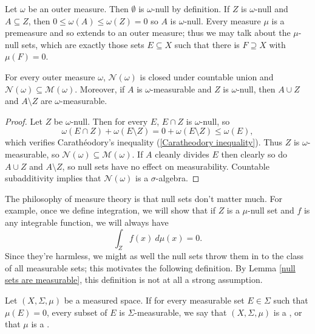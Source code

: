\begin{subsec}
Let $\omega$ be an outer measure. Then $\emptyset$ is $\omega$-null by definition.
If $Z$ is $\omega$-null and $A \subseteq Z$, then $0 \leq \omega(A) \leq \omega(Z) = 0$ so $A$ is $\omega$-null.
Every measure $\mu$ is a premeasure and so extends to an outer measure; thus we may talk about the $\mu$-null sets, which are exactly those sets $E \subseteq X$ such that there is $F \supseteq X$ with $\mu(F) = 0$.
\end{subsec}

\begin{lemma}
\label{null sets are measurable}
For every outer measure $\omega$, $\mathcal N(\omega)$ is closed under countable union and $\mathcal N(\omega) \subseteq \mathcal M(\omega)$.
Moreover, if $A$ is $\omega$-measurable and $Z$ is $\omega$-null, then $A \cup Z$ and $A \setminus Z$ are $\omega$-measurable.
\end{lemma}
\begin{proof}
Let $Z$ be $\omega$-null. Then for every $E$, $E \cap Z$ is $\omega$-null, so
\[\omega(E \cap Z) + \omega(E \setminus Z) = 0 + \omega(E \setminus Z) \leq \omega(E),\]
which verifies Carathéodory's inequality (\ref{Caratheodory inequality}).
Thus $Z$ is $\omega$-measurable, so $\mathcal N(\omega) \subseteq \mathcal M(\omega)$.
If $A$ cleanly divides $E$ then clearly so do $A \cup Z$ and $A \setminus Z$, so null sets have no effect on measurability.
Countable subadditivity implies that $\mathcal N(\omega)$ is a $\sigma$-algebra.
\end{proof}

\begin{subsec}
The philosophy of measure theory is that null sets don't matter much.
For example, once we define integration, we will show that if $Z$ is a $\mu$-null set and $f$ is any integrable function, we will always have
$$\int_Z f(x) ~d\mu(x) = 0.$$
Since they're harmless, we might as well the null sets throw them in to the class of all measurable sets; this motivates the following definition.
By Lemma \ref{null sets are measurable}, this definition is not at all a strong assumption.
\end{subsec}

\begin{definition}
Let $(X, \Sigma, \mu)$ be a measured space.
If for every measurable set $E \in \Sigma$ such that $\mu(E) = 0$, every subset of $E$ is $\Sigma$-measurable, we say that $(X, \Sigma, \mu)$ is a , or that $\mu$ is a .
\end{definition}

